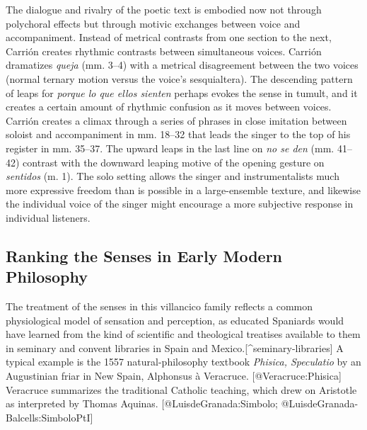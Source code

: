 \label{music:Carrion-Si_los_sentidos}

The dialogue and rivalry of the poetic text is embodied now not through polychoral effects but through motivic exchanges between voice and accompaniment.
Instead of metrical contrasts from one section to the next, Carrión creates rhythmic contrasts between simultaneous voices.
Carrión dramatizes \emph{queja} (mm. 3--4) with a metrical disagreement between the two voices (normal ternary motion versus the voice's sesquialtera).
The descending pattern of leaps for \emph{porque lo que ellos sienten} perhaps evokes the sense in tumult, and it creates a certain amount of rhythmic confusion as it moves between voices.
Carrión creates a climax through a series of phrases in close imitation between soloist and accompaniment in mm. 18--32 that leads the singer to the top of his register in mm. 35--37.
The upward leaps in the last line on \emph{no se den} (mm. 41--42) contrast with the downward leaping motive of the opening gesture on \emph{sentidos} (m. 1).
The solo setting allows the singer and instrumentalists much more expressive freedom than is possible in a large-ensemble texture, and likewise the individual voice of the singer might encourage a more subjective response in individual listeners.


\subsection{Ranking the Senses in Early Modern Philosophy}

The treatment of the senses in this villancico family reflects a common physiological model of sensation and perception, as educated Spaniards would have learned from the kind of scientific and theological treatises available to them in seminary and convent libraries in Spain and Mexico.[^seminary-libraries]
A typical example is the 1557 natural-philosophy textbook \emph{Phisica, Speculatio} by an Augustinian friar in New Spain, Alphonsus à Veracruce.
[@Veracruce:Phisica]
Veracruce summarizes the traditional Catholic teaching, which drew on Aristotle as interpreted by Thomas Aquinas.
[@LuisdeGranada:Simbolo; @LuisdeGranada-Balcells:SimboloPtI]

